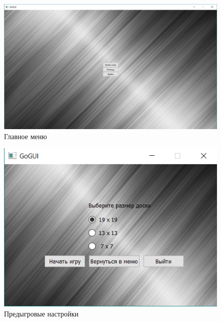 \begin{figure}[H]
	\begin{center}
		\includegraphics[scale=0.5]{pics/GoGUI/Menu.png}
	    \caption{Главное меню} 
		\label{pic:CUI_Menu}
	\end{center}
\end{figure}

\begin{figure}[H]
	\begin{center}
		\includegraphics[scale=0.6]{pics/GoGUI/Settings.png}
	    \caption{Предыгровые настройки} 
		\label{pic:CUI_Settings}
	\end{center}
\end{figure}

